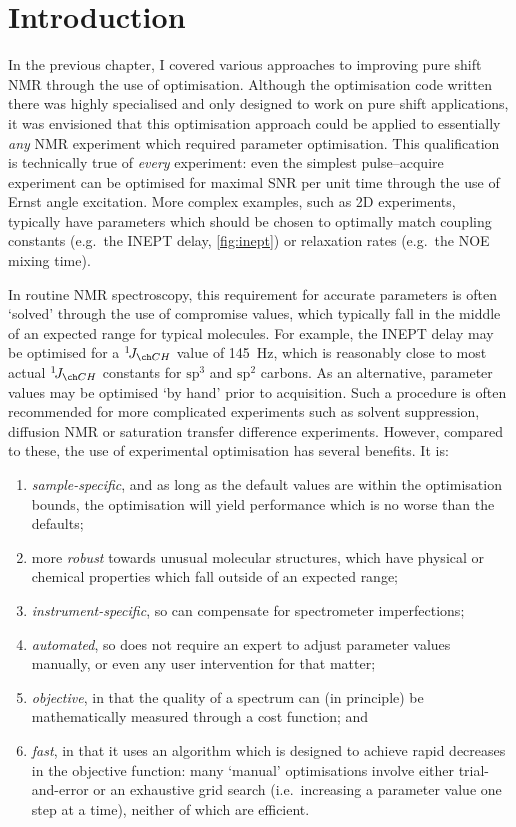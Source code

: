 \section{Introduction}
\label{sec:poise__introduction}

In the previous chapter, I covered various approaches to improving pure shift NMR through the use of optimisation.
Although the optimisation code written there was highly specialised and only designed to work on pure shift applications, it was envisioned that this optimisation approach could be applied to essentially \textit{any} NMR experiment which required parameter optimisation.
This qualification is technically true of \textit{every} experiment: even the simplest pulse--acquire experiment can be optimised for maximal SNR per unit time through the use of Ernst angle excitation.
More complex examples, such as 2D experiments, typically have parameters which should be chosen to optimally match coupling constants (e.g.\ the INEPT delay, \cref{fig:inept}) or relaxation rates (e.g.\ the NOE mixing time).

In routine NMR spectroscopy, this requirement for accurate parameters is often `solved' through the use of compromise values, which typically fall in the middle of an expected range for typical molecules.
For example, the INEPT delay may be optimised for a $\oneJ{CH}$ value of \qty{145}{\Hz}, which is reasonably close to most actual $\oneJ{CH}$ constants for $\mathrm{sp^3}$ and $\mathrm{sp^2}$ carbons.
As an alternative, parameter values may be optimised `by hand' prior to acquisition.
Such a procedure is often recommended for more complicated experiments such as solvent suppression, diffusion NMR or saturation transfer difference experiments.
However, compared to these, the use of experimental optimisation has several benefits.
It is:
\begin{enumerate}
    \item \textit{sample-specific}, and as long as the default values are within the optimisation bounds, the optimisation will yield performance which is no worse than the defaults;
    \item more \textit{robust} towards unusual molecular structures, which have physical or chemical properties which fall outside of an expected range;
    \item \textit{instrument-specific}, so can compensate for spectrometer imperfections;
    \item \textit{automated}, so does not require an expert to adjust parameter values manually, or even any user intervention for that matter;
    \item \textit{objective}, in that the quality of a spectrum can (in principle) be mathematically measured through a cost function; and
    \item \textit{fast}, in that it uses an algorithm which is designed to achieve rapid decreases in the objective function: many `manual' optimisations involve either trial-and-error or an exhaustive grid search (i.e.\ increasing a parameter value one step at a time), neither of which are efficient.
\end{enumerate}

